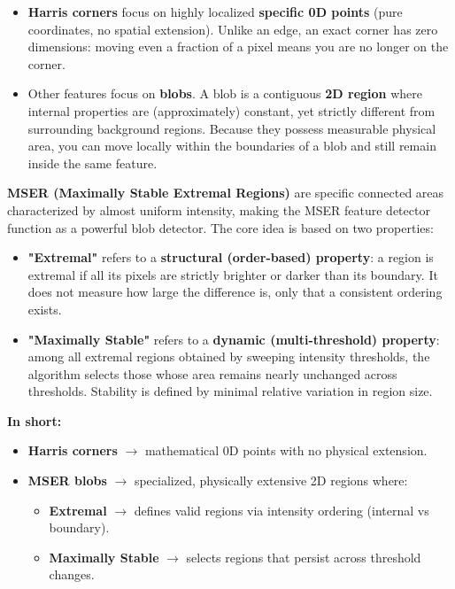 {
\begin{itemize}
    \item \textbf{Harris corners} focus on highly localized \textbf{specific 0D points} (pure coordinates, no spatial extension). Unlike an edge, an exact corner has zero dimensions: moving even a fraction of a pixel means you are no longer on the corner.
    \item Other features focus on \textbf{blobs}. A blob is a contiguous \textbf{2D region} where internal properties are (approximately) constant, yet strictly different from surrounding background regions. Because they possess measurable physical area, you can move locally within the boundaries of a blob and still remain inside the same feature.
\end{itemize}

\textbf{MSER (Maximally Stable Extremal Regions)} are specific connected areas characterized by almost uniform intensity, making the MSER feature detector function as a powerful blob detector. The core idea is based on two properties:
\begin{itemize}
    \item \textbf{"Extremal"} refers to a \textbf{structural (order-based) property}: a region is extremal if all its pixels are strictly brighter or darker than its boundary. It does not measure how large the difference is, only that a consistent ordering exists.
    \item \textbf{"Maximally Stable"} refers to a \textbf{dynamic (multi-threshold) property}: among all extremal regions obtained by sweeping intensity thresholds, the algorithm selects those whose area remains nearly unchanged across thresholds. Stability is defined by minimal relative variation in region size.
\end{itemize}

\textbf{In short:}
\begin{itemize}
    \item \textbf{Harris corners} $\rightarrow$ mathematical 0D points with no physical extension.
    \item \textbf{MSER blobs} $\rightarrow$ specialized, physically extensive 2D regions where:
    \begin{itemize}
        \item \textbf{Extremal} $\rightarrow$ defines valid regions via intensity ordering (internal vs boundary).
        \item \textbf{Maximally Stable} $\rightarrow$ selects regions that persist across threshold changes.
    \end{itemize}
\end{itemize}
}



